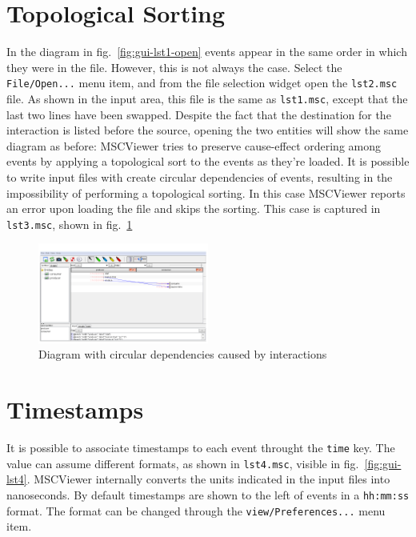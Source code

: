 \documentclass[11pt, twoside, titlepage]{book}
\newcommand{\prog}{MSCViewer}
\begin{document}
\section{Topological Sorting}
In the diagram in fig.~\ref{fig:gui-lst1-open} events appear in the 
same order in which they were in the file. However, this is not always
the case. Select the \texttt{File/Open...} menu item, and from the file
selection widget open the \texttt{lst2.msc} file. As shown in the input area,
this file is the same as \texttt{lst1.msc}, except that the last two lines have
been swapped. Despite the fact that the destination for the interaction is
listed before the source, opening the two entities will show the same diagram as
before: \prog{} tries to preserve cause-effect ordering among events by applying
a topological sort to the events as they're loaded. It is possible to write
input files with create circular dependencies of events, resulting in the
impossibility of performing a topological sorting. In this case \prog{} reports
an error upon loading the file and skips the sorting. This case is captured in
\texttt{lst3.msc}, shown in fig.~\ref{fig:gui-lst3}

\begin{figure}[ht!]
  \centering
  \includegraphics[width=0.5\textwidth,natwidth=1024,natheight=600]{images/gui-ex3-cycle.png}
  \caption{Diagram with circular dependencies caused by interactions}
  \label{fig:gui-lst3}
\end{figure}

\section{Timestamps}
It is possible to associate timestamps to each event throught the \texttt{time}
key. The value can assume different formats, as shown in \texttt{lst4.msc},
visible in fig.~\ref{fig:gui-lst4}. \prog{} internally converts the units
indicated in the input files into nanoseconds. By default timestamps are shown
to the left of events in a \texttt{hh:mm:ss} format. The format can be changed
through the \texttt{view/Preferences...} menu item.
\end{document}
